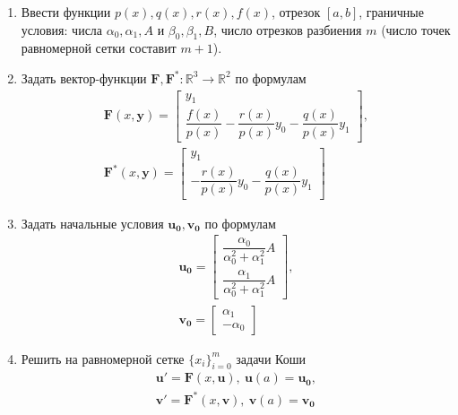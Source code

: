 \documentclass[a4paper, 12pt]{article}
\begin{document}
	\begin{enumerate}
		\item Ввести функции $p(x),q(x),r(x),f(x)$, отрезок $[a,b]$, граничные условия: числа $\alpha_0, \alpha_1, A$ и $\beta_0, \beta_1, B$, число отрезков разбиения $m$ (число точек равномерной сетки составит $m+1$).
		\item Задать вектор-функции $\mathbf{F}, \mathbf{F^*}:\mathbb{R}^3\rightarrow\mathbb{R}^2$ по формулам
		\begin{equation}
			\begin{gathered}
				\mathbf{F}(x, \mathbf{y}) =
				\begin{bmatrix}
					y_1\\
					\dfrac{f(x)}{p(x)}-\dfrac{r(x)}{p(x)}y_0-\dfrac{q(x)}{p(x)}y_1
				\end{bmatrix},\\
				\mathbf{F^*}(x, \mathbf{y}) =
				\begin{bmatrix}
					y_1\\
					-\dfrac{r(x)}{p(x)}y_0-\dfrac{q(x)}{p(x)}y_1
				\end{bmatrix}
			\end{gathered}
		\end{equation}
		\item Задать начальные условия $\mathbf{u_0}, \mathbf{v_0}$ по формулам
		\begin{equation}
			\begin{gathered}
				\mathbf{u_0} =
				\begin{bmatrix}
					\dfrac{\alpha_0}{\alpha_0^2+\alpha_1^2}A\\
					\dfrac{\alpha_1}{\alpha_0^2+\alpha_1^2}A
				\end{bmatrix},\\
				\mathbf{v_0} =
				\begin{bmatrix}
					\alpha_1\\
					-\alpha_0
				\end{bmatrix}
			\end{gathered}
		\end{equation}
		\item Решить на равномерной сетке $\{x_i\}_{i=0}^m$ задачи Коши
		\begin{equation}
			\begin{gathered}
				\mathbf{u'}=\mathbf{F}(x,\mathbf{u}), \ \mathbf{u}(a)=\mathbf{u_0},\\
				\mathbf{v'}=\mathbf{F^*}(x,\mathbf{v}), \ \mathbf{v}(a)=\mathbf{v_0}
			\end{gathered}
		\end{equation}

\end{enumerate}
\end{document}
